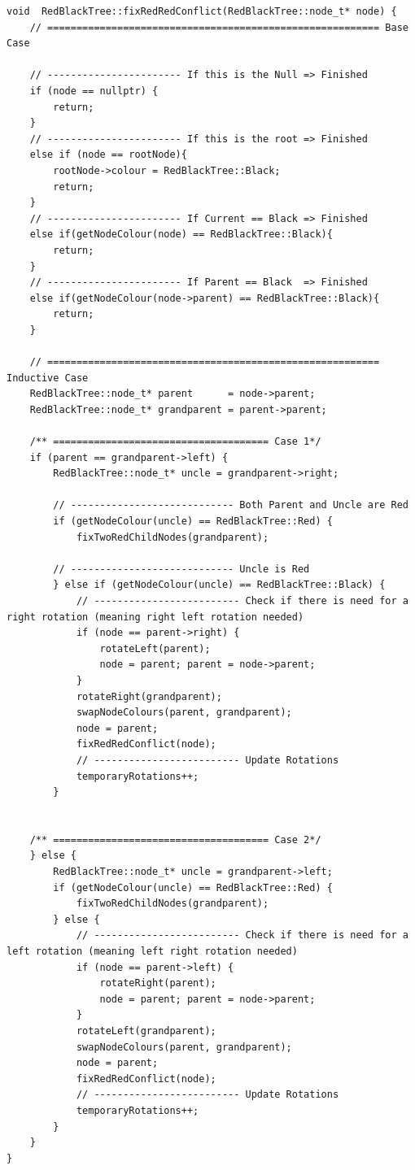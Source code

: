\documentclass[12pt, a4paper]{report}
\begin{document}
\begin{verbatim}
void  RedBlackTree::fixRedRedConflict(RedBlackTree::node_t* node) {
    // ========================================================= Base Case

    // ----------------------- If this is the Null => Finished 
    if (node == nullptr) {
        return;
    }   
    // ----------------------- If this is the root => Finished 
    else if (node == rootNode){
        rootNode->colour = RedBlackTree::Black;
        return;
    }   
    // ----------------------- If Current == Black => Finished
    else if(getNodeColour(node) == RedBlackTree::Black){
        return;
    }   
    // ----------------------- If Parent == Black  => Finished
    else if(getNodeColour(node->parent) == RedBlackTree::Black){
        return;
    }

    // ========================================================= Inductive Case
    RedBlackTree::node_t* parent      = node->parent;
    RedBlackTree::node_t* grandparent = parent->parent;

    /** ===================================== Case 1*/
    if (parent == grandparent->left) {
        RedBlackTree::node_t* uncle = grandparent->right;

        // ---------------------------- Both Parent and Uncle are Red
        if (getNodeColour(uncle) == RedBlackTree::Red) {
            fixTwoRedChildNodes(grandparent);

        // ---------------------------- Uncle is Red
        } else if (getNodeColour(uncle) == RedBlackTree::Black) {
            // ------------------------- Check if there is need for a right rotation (meaning right left rotation needed)
            if (node == parent->right) {  
                rotateLeft(parent);
                node = parent; parent = node->parent;
            }
            rotateRight(grandparent);
            swapNodeColours(parent, grandparent);
            node = parent;
            fixRedRedConflict(node);
            // ------------------------- Update Rotations
            temporaryRotations++;
        }


    /** ===================================== Case 2*/
    } else {
        RedBlackTree::node_t* uncle = grandparent->left;
        if (getNodeColour(uncle) == RedBlackTree::Red) {
            fixTwoRedChildNodes(grandparent);
        } else {
            // ------------------------- Check if there is need for a left rotation (meaning left right rotation needed)
            if (node == parent->left) {
                rotateRight(parent);
                node = parent; parent = node->parent;
            }
            rotateLeft(grandparent);
            swapNodeColours(parent, grandparent);
            node = parent;
            fixRedRedConflict(node);
            // ------------------------- Update Rotations
            temporaryRotations++;
        }
    }
}
\end{verbatim}
\end{document}
